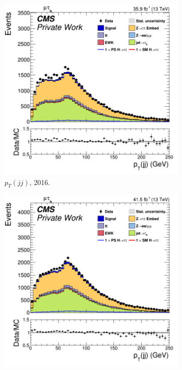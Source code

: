 \begin{figure}
  \begin{subfigure}[b]{0.33\linewidth}
    \centering
    \includegraphics[width=\linewidth]{Chapitre7/Images/CtrlPlots/2016/DijetpT.png} 
    \caption{$p_T(jj)$, 2016.} 
    \vspace{0.5ex}
  \end{subfigure}%
  \begin{subfigure}[b]{0.33\linewidth}
    \centering
    \includegraphics[width=\linewidth]{Chapitre7/Images/CtrlPlots/2017/DijetpT.png} 

\end{subfigure}
\end{figure}
